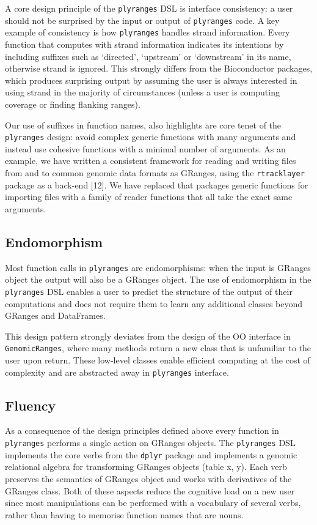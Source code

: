 \documentclass[10pt,letterpaper]{article}
\begin{document}
A core design principle of the \texttt{plyranges} DSL is interface
consistency: a user should not be surprised by the input or output of
\texttt{plyranges} code. A key example of consistency is how
\texttt{plyranges} handles strand information. Every function that
computes with strand information indicates its intentions by including
suffixes such as `directed', `upstream' or `downstream' in its name,
otherwise strand is ignored. This strongly differs from the Bioconductor
packages, which produces surprising output by assuming the user is
always interested in using strand in the majority of circumstances
(unless a user is computing coverage or finding flanking ranges).

Our use of suffixes in function names, also highlights are core tenet of
the \texttt{plyranges} design: avoid complex generic functions with many
arguments and instead use cohesive functions with a minimal number of
arguments. As an example, we have written a consistent framework for
reading and writing files from and to common genomic data formats as
GRanges, using the \texttt{rtracklayer} package as a back-end {[}12{]}.
We have replaced that packages generic functions for importing files
with a family of reader functions that all take the exact same
arguments.

\subsection{Endomorphism}\label{endomorphism}

Most function calls in \texttt{plyranges} are endomorphisms: when the
input is GRanges object the output will also be a GRanges object. The
use of endomorphism in the \texttt{plyranges} DSL enables a user to
predict the structure of the output of their computations and does not
require them to learn any additional classes beyond GRanges and
DataFrames.

This design pattern strongly deviates from the design of the OO
interface in \texttt{GenomicRanges}, where many methods return a new
class that is unfamiliar to the user upon return. These low-level
classes enable efficient computing at the cost of complexity and are
abstracted away in \texttt{plyranges} interface.

\subsection{Fluency}\label{fluency}

As a consequence of the design principles defined above every function
in \texttt{plyranges} performs a single action on GRanges objects. The
\texttt{plyranges} DSL implements the core verbs from the \texttt{dplyr}
package and implements a genomic relational algebra for transforming
GRanges objects (table x, y). Each verb preserves the semantics of
GRanges object and works with derivatives of the GRanges class. Both of
these aspects reduce the cognitive load on a new user since most
manipulations can be performed with a vocabulary of several verbs,
rather than having to memorise function names that are nouns.
\end{document}
